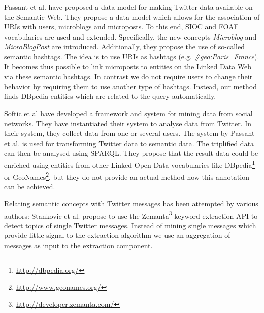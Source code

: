\documentclass{llncs}
\begin{document}
Passant et al. \cite{key:smob} have proposed a data model for making Twitter data available on the Semantic Web. They propose a data model which allows for the association of URIs with users, microblogs and microposts. To this end, SIOC and FOAF vocabularies are used and extended. Specifically, the new concepts \emph{Microblog} and \emph{MicroBlogPost} are introduced. Additionally, they propose the use of so-called semantic hashtags. The idea is to use URIs as hashtags (e.g. \emph{\#geo:Paris\_France}). It becomes thus possible to link microposts to entities on the Linked Data Web via these semantic hashtags. 
In contrast we do not require users to change their behavior by requiring them to use another type of hashtags. Instead, our method finds DBpedia entities which are related to the query automatically.

Softic et al \cite{key:softic} have developed a framework and system for mining data from social networks. They have instantiated their system to analyse data from Twitter. In their system, they collect data from one or several users. The system by Passant et al. \cite{key:smob} is used for transforming Twitter data to semantic data. The triplified data can then be analysed using SPARQL. They propose that the result data could be enriched using entities from other Linked Open Data vocabularies like DBpedia\footnote{\url{http://dbpedia.org/}} or GeoNames\footnote{\url{http://www.geonames.org/}}, but they do not provide an actual method how this annotation can be achieved.

Relating semantic concepts with Twitter messages has been attempted by various authors:
Stankovic et al. \cite{key:stanko} propose to use the Zemanta\footnote{\url{http://developer.zemanta.com/}} keyword extraction API to detect topics of single Twitter messages. 
Instead of mining single messages which provide little signal to the extraction algorithm we use an aggregation of messages as input to the extraction component.
\end{document}
